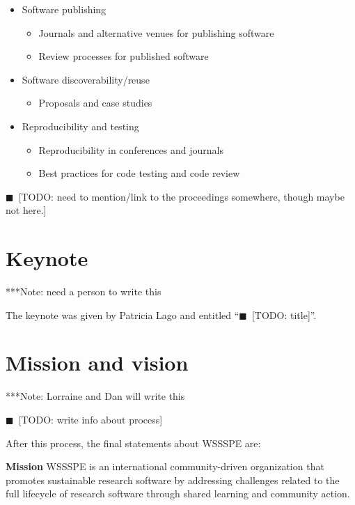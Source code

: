 \documentclass[11pt, oneside]{amsart}
\newcommand{\todo}[1]{{\color{blue}$\blacksquare$~\textsf{[TODO: #1]}}}
\newcommand{\note}[1]{ {\textcolor{blueish}    { ***Note:      #1 }}}
\begin{document}
\begin{itemize}
\item Software publishing
\begin{itemize}
    \item Journals and alternative venues for publishing software
    \item Review processes for published software
\end{itemize}

\item Software discoverability/reuse
\begin{itemize}
    \item Proposals and case studies
\end{itemize}

\item Reproducibility and testing
\begin{itemize}
    \item Reproducibility in conferences and journals
    \item Best practices for code testing and code review
\end{itemize}

\end{itemize}

\todo{need to mention/link to the proceedings somewhere, though maybe not here.}

\section{Keynote}\label{sec:keynote}

\note{need a person to write this}

The keynote was given by Patricia Lago and entitled ``\todo{title}''.

\section{Mission and vision}\label{sec:mission}

\note{Lorraine and Dan will write this}

\todo{write info about process}

After this process, the final statements about WSSSPE are:

{\bf Mission}
WSSSPE is an international community-driven organization that promotes sustainable research software by addressing challenges related to the full lifecycle of research software through shared learning and community action.
\end{document}
